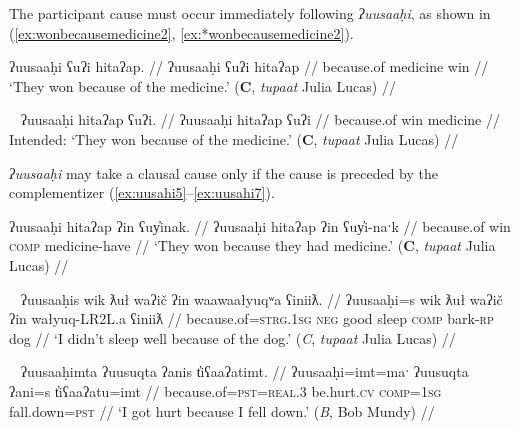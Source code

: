 The participant cause must occur immediately following \textit{ʔuusaaḥi}, as shown in (\ref{ex:wonbecausemedicine2}, \ref{ex:*wonbecausemedicine2}).

\ex \label{ex:wonbecausemedicine2}
\begingl
\glpreamble ʔuusaaḥi ʕuʔi hitaʔap. //
\gla ʔuusaaḥi ʕuʔi hitaʔap //
\glb because.of medicine win //
\glft `They won because of the medicine.' (\textbf{C}, \textit{tupaat} Julia Lucas) //
\endgl
\xe

\ex~ \label{ex:*wonbecausemedicine2}
\begingl
\glpreamble *ʔuusaaḥi hitaʔap ʕuʔi. //
\gla ʔuusaaḥi hitaʔap ʕuʔi //
\glb because.of win medicine //
\glft Intended: `They won because of the medicine.' (\textbf{C}, \textit{tupaat} Julia Lucas) //
\endgl
\xe

\textit{ʔuusaaḥi} may take a clausal cause only if the cause is preceded by the complementizer (\ref{ex:uusahi5}--\ref{ex:uusahi7}).

\ex \label{ex:uusahi5}
\begingl
\glpreamble ʔuusaaḥi hitaʔap ʔin ʕuy̓inak. //
\gla ʔuusaaḥi hitaʔap ʔin ʕuy̓i-naˑk //
\glb because.of win \textsc{comp} medicine-have  //
\glft `They won because they had medicine.' (\textbf{C}, \textit{tupaat} Julia Lucas) //
\endgl
\xe

\ex~ \label{ex:uusahi6}
\begingl
\glpreamble ʔuusaaḥis wik ƛuł waʔič ʔin waawaałyuqʷa ʕiniiƛ. //
\gla ʔuusaaḥi=s wik ƛuł waʔič ʔin wałyuq-LR2L.a ʕiniiƛ //
\glb because.of=\textsc{strg.1sg} \textsc{neg} good sleep \textsc{comp} bark-\textsc{rp} dog  //
\glft `I didn't sleep well because of the dog.' (\textit{C}, \textit{tupaat} Julia Lucas) //
\endgl
\xe

\ex~ \label{ex:uusahi7}
\begingl
\glpreamble ʔuusaaḥimta ʔuusuqta ʔanis t̓iʕaaʔatimt. //
\gla ʔuusaaḥi=imt=maˑ ʔuusuqta ʔani=s t̓iʕaaʔatu=imt //
\glb because.of=\textsc{pst}=\textsc{real.3} be.hurt.\textsc{cv} \textsc{comp}=\textsc{1sg} fall.down=\textsc{pst}  //
\glft `I got hurt because I fell down.' (\textit{B}, Bob Mundy) //
\endgl
\xe

\begin{comment}
[[TODO: uusahi plus linker ]]
\textit{ʔuusaaḥi} may only be able to take the linker when it is non-initial. Both consultants with whom I attempted to add a linker to an ʔuusaaḥi-initial sentence were uncertain if it was okay or not but felt it was weird (\ref{ex:uusahi7}, \ref{ex:uusahi8}).

\ex \label{ex:uusahi7}
\begingl
\glpreamble ?? ʔuusaaḥiqḥita nay̓aqakʔi wikitaḥ ƛuł weʔič. //
\gla ʔuusaaḥi-(q)ḥ=(m)it=(m)aˑ nay̓aqak=ʔiˑ wik=(m)it=(m)aˑḥ ƛuł weʔič //
\glb because.of-\textsc{link}=\textsc{pst}=\textsc{real.3} baby=\textsc{art} \textsc{neg}=\textsc{pst}=\textsc{real.1sg} good sleep //
\glft Intended: `I didn't sleep well because of the baby.' (\textbf{B}, Bob Mundy) //
\endgl
\xe

*? ʔuusaaḥiqḥʔiš ʔuusaqta wik̓aałukʷint

ʔuusaqtumtʔiš ʔuusaaḥiqḥ wik̓aałukʷint
\end{comment}

